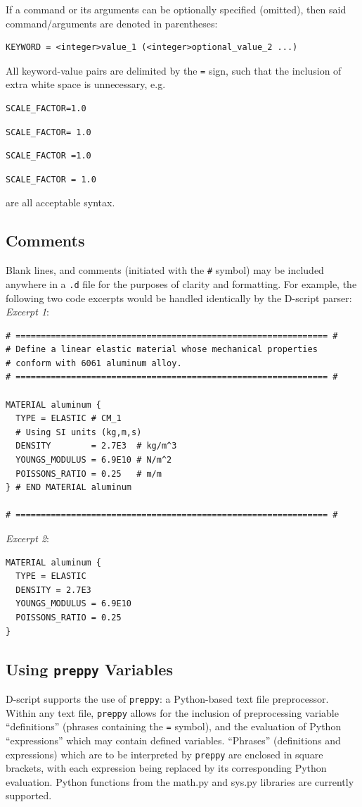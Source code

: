 \documentclass[11pt]{article} %
\begin{document}
If a command or its arguments can be optionally specified (omitted), then said command/arguments are denoted in parentheses:
\begin{lstlisting}
KEYWORD = <integer>value_1 (<integer>optional_value_2 ...)
\end{lstlisting}

All keyword-value pairs are delimited by the \texttt{=} sign, such that the inclusion of extra white space is unnecessary, e.g.
\begin{lstlisting}
SCALE_FACTOR=1.0
\end{lstlisting}
\begin{lstlisting}
SCALE_FACTOR= 1.0
\end{lstlisting}
\begin{lstlisting}
SCALE_FACTOR =1.0
\end{lstlisting}
\begin{lstlisting}
SCALE_FACTOR = 1.0
\end{lstlisting}
are all acceptable syntax.
\newpage
\subsection{Comments} Blank lines, and comments (initiated with the \texttt{\#} symbol) may be included anywhere in a \texttt{.d} file for the purposes of clarity and formatting. For example, the following two code excerpts would be handled identically by the D-script parser: \newline
\textit{Excerpt 1}:
\begin{lstlisting}
# ============================================================== #
# Define a linear elastic material whose mechanical properties
# conform with 6061 aluminum alloy.
# ============================================================== #

MATERIAL aluminum {
  TYPE = ELASTIC # CM_1
  # Using SI units (kg,m,s)
  DENSITY        = 2.7E3  # kg/m^3
  YOUNGS_MODULUS = 6.9E10 # N/m^2
  POISSONS_RATIO = 0.25   # m/m
} # END MATERIAL aluminum

# ============================================================== #
\end{lstlisting}
\textit{Excerpt 2}:
\begin{lstlisting}
MATERIAL aluminum {
  TYPE = ELASTIC
  DENSITY = 2.7E3
  YOUNGS_MODULUS = 6.9E10
  POISSONS_RATIO = 0.25
}
\end{lstlisting}

\subsection{Using \texttt{preppy} Variables} D-script supports the use of \texttt{preppy}: a Python-based text file preprocessor. Within any text file, \texttt{preppy} allows for the inclusion of preprocessing variable ``definitions'' (phrases containing the \texttt{=} symbol), and the evaluation of Python ``expressions'' which may contain defined variables. ``Phrases'' (definitions and expressions) which are to be interpreted by \texttt{preppy} are enclosed in square brackets, with each expression being replaced by its corresponding Python evaluation. Python functions from the math.py and sys.py libraries are currently supported.
\end{document}
